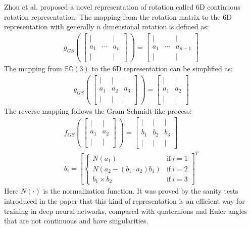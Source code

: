 \documentclass[12pt,DIV14,BCOR12mm,a4paper,footinclude=false,headinclude,parskip=half-,twoside,openright,cleardoublepage=empty,toc=index,bibliography=totoc,listof=totoc]{scrreprt}
\numberwithin{equation}{chapter}
\begin{document}
Zhou et al. \cite{Zhou_2019_CVPR} proposed a novel representation of rotation called 6D continuous rotation representation. The mapping from the rotation matrix to the 6D representation with generally $n$ dimensional rotation is defined as:
\begin{align}
  g_{GS}\left( \
    \begin{bmatrix}
      | & & | \\
      a_{1}  & \cdots & a_{n} \\
      | & & |
    \end{bmatrix} \
  \right) = 
  \begin{bmatrix}
    | & & | \\
    a_{1}  & \cdots & a_{n-1} \\
    | & & |
  \end{bmatrix}
\end{align}
The mapping from $\mathbb{S} \mathbb{O} (3)$ to the 6D representation can be simplified as:
\begin{align}\label{eq:ortho6d}
  g_{GS}\left( \
    \begin{bmatrix}
      | & | & | \\
      a_{1}  & a_{2} & a_{3} \\
      | & | & |
    \end{bmatrix} \
  \right) = 
  \begin{bmatrix}
    | & | \\
    a_{1} & a_{2} \\
    | & |
  \end{bmatrix}
\end{align}
The reverse mapping follows the Gram-Schmidt-like process:
\begin{gather}
  f_{GS}\left( \ 
    \begin{bmatrix}
      | & | \\
      a_{1}  & a_{2}  \\
      | & | 
    \end{bmatrix} \
  \right) = 
  \begin{bmatrix}
    | & | & |\\
    b_{1} & b_{2} & b_{3}\\
    | & | & |
  \end{bmatrix} \\
  b_{i} = \left[\left\{
    \begin{array}{lr}
    N(a_{1}) & \text{if} \ i=1\\
    N(a_{2}-(b_{1}\cdot a_{2})b_{1}) & \text{if} \ i=2\\
    b_{1}\times b_{2}& \text{if} \ i=3
    \end{array} 
  \right.
  \right] ^{T}
\end{gather}
Here $N(\cdot)$ is the normalization function. It was proved by the sanity tests introduced in the paper that this kind of representation is an efficient way for training in deep neural networks, compared with quaternions and Euler angles that are not continuous and have singularities.
\end{document}
